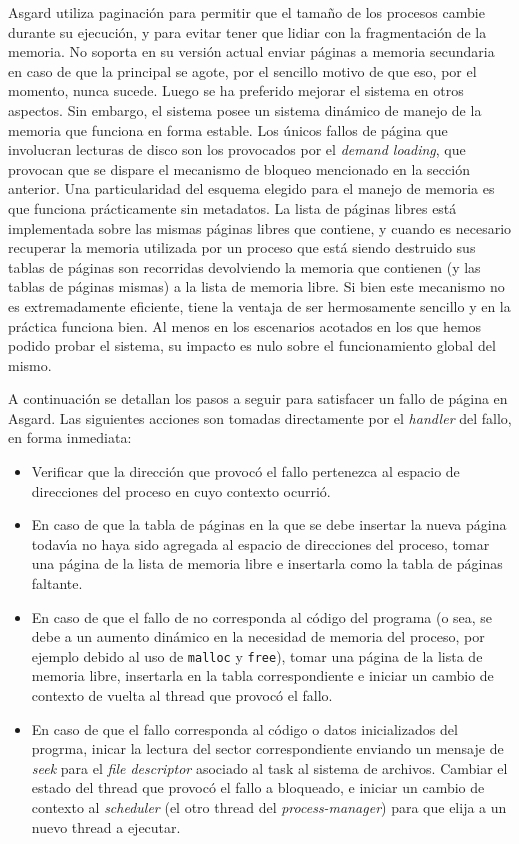 \documentclass[11pt, letterpaper, twoside]{book}
\begin{document}
Asgard utiliza paginaci\'on para permitir que el tama\~no de los procesos cambie durante su ejecuci\'on, y para evitar tener que lidiar con la fragmentaci\'on de la memoria. No soporta en su versi\'on actual enviar p\'aginas a memoria secundaria en caso de que la principal se agote, por el sencillo motivo de que eso, por el momento, nunca sucede. Luego se ha preferido mejorar el sistema en otros aspectos. Sin embargo, el sistema posee un sistema din\'amico de manejo de la memoria que funciona en forma estable. Los \'unicos fallos de p\'agina que involucran lecturas de disco son los provocados por el \emph{demand loading}, que provocan que se dispare el mecanismo de bloqueo mencionado en la secci\'on anterior. Una particularidad del esquema elegido para el manejo de memoria es que funciona pr\'acticamente sin metadatos. La lista de p\'aginas libres est\'a implementada sobre las mismas p\'aginas libres que contiene, y cuando es necesario recuperar la memoria utilizada por un proceso que est\'a siendo destruido sus tablas de p\'aginas son recorridas devolviendo la memoria que contienen (y las tablas de p\'aginas mismas) a la lista de memoria libre. Si bien este mecanismo no es extremadamente eficiente, tiene la ventaja de ser hermosamente sencillo y en la pr\'actica funciona bien. Al menos en los escenarios acotados en los que hemos podido probar el sistema, su impacto es nulo sobre el funcionamiento global del mismo. 

A continuaci\'on se detallan los pasos a seguir para satisfacer un fallo de p\'agina en Asgard. Las siguientes acciones son tomadas directamente por el \emph{handler} del fallo, en forma inmediata:

\begin{itemize}
\item Verificar que la direcci\'on que provoc\'o el fallo pertenezca al espacio de direcciones del proceso en cuyo contexto ocurri\'o.
\item En caso de que la tabla de p\'aginas en la que se debe insertar la nueva p\'agina todav\'\i{}a no haya sido agregada al espacio de direcciones del proceso, tomar una p\'agina de la lista de memoria libre e insertarla como la tabla de p\'aginas faltante.
\item En caso de que el fallo de no corresponda al c\'odigo del programa (o sea, se debe a un aumento din\'amico en la necesidad de memoria del proceso, por ejemplo debido al uso de \texttt{malloc} y \texttt{free}), tomar una p\'agina de la lista de memoria libre, insertarla en la tabla correspondiente e iniciar un cambio de contexto de vuelta al thread que provoc\'o el fallo.
\item En caso de que el fallo corresponda al c\'odigo o datos inicializados del progrma, inicar la lectura del sector correspondiente enviando un mensaje de \emph{seek} para el \emph{file descriptor} asociado al task al sistema de archivos. Cambiar el estado del thread que provoc\'o el fallo a bloqueado, e iniciar un cambio de contexto al \emph{scheduler} (el otro thread del \emph{process-manager}) para que elija a un nuevo thread a ejecutar.

\end{itemize}
\end{document}
